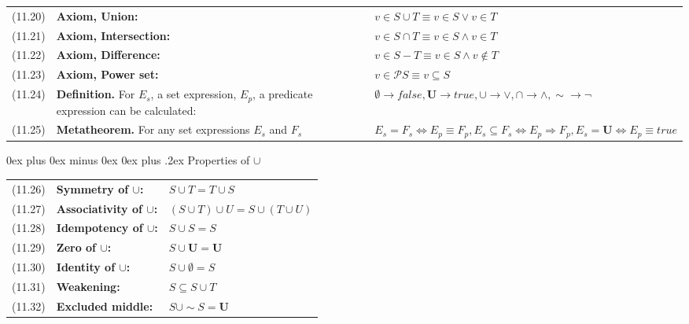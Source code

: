 \documentclass[letterpaper, 8pt]{extarticle}
\makeatletter
\renewcommand{\subsection}{\@startsection{subsection}{2}{0mm}%
                                {0ex plus 0ex minus 0ex}%
                                {0ex plus .2ex}%
                                {\normalfont\small\bfseries}}
\newcommand{\To}{\Rightarrow}
\makeatother
\begin{document}
\begin{multicols*}{3}
\begin{tabulary}{\linewidth}{@{}lLL@{}}
        (11.20) & \textbf{Axiom, Union:} & $v \in S \cup T \equiv v \in S \lor v \in T$ \\
        (11.21) & \textbf{Axiom, Intersection:} & $v \in S \cap T \equiv v \in S \land v \in T$ \\
        (11.22) & \textbf{Axiom, Difference:} & $v \in S - T \equiv v \in S \land v \not\in T$ \\
        (11.23) & \textbf{Axiom, Power set:} & $v \in \mathcal{P} S \equiv v \subseteq S$ \\
        (11.24) & \textbf{Definition.} For $E_s$, a set expression, $E_p$, a predicate expression can be calculated: & $\emptyset \to false, \mathbf{U} \to true, \cup \to \lor, \cap \to \land, \sim \to \neg$ \\
        (11.25) & \textbf{Metatheorem.} For any set expressions $E_s$ and $F_s$ & $E_s = F_s \Leftrightarrow E_p \equiv F_p, E_s \subseteq F_s \Leftrightarrow E_p \To F_p, E_s = \mathbf{U} \Leftrightarrow E_p \equiv true$ \\
    \end{tabulary}
    \subsection{Properties of $\cup$}
    \begin{tabulary}{\linewidth}{@{}lLL@{}}
        (11.26) & \textbf{Symmetry of $\cup$:} & $S \cup T = T \cup S$ \\
        (11.27) & \textbf{Associativity of $\cup$:} & $(S \cup T) \cup U = S \cup (T \cup U)$ \\
        (11.28) & \textbf{Idempotency of $\cup$:} & $S \cup S = S$ \\
        (11.29) & \textbf{Zero of $\cup$:} & $S \cup \mathbf{U} = \mathbf{U}$ \\
        (11.30) & \textbf{Identity of $\cup$:} & $S \cup \emptyset = S$ \\
        (11.31) & \textbf{Weakening:} & $S \subseteq S \cup T$ \\
        (11.32) & \textbf{Excluded middle:} & $S \cup \sim S = \mathbf{U}$ \\
    \end{tabulary}

\end{multicols*}
\end{document}
